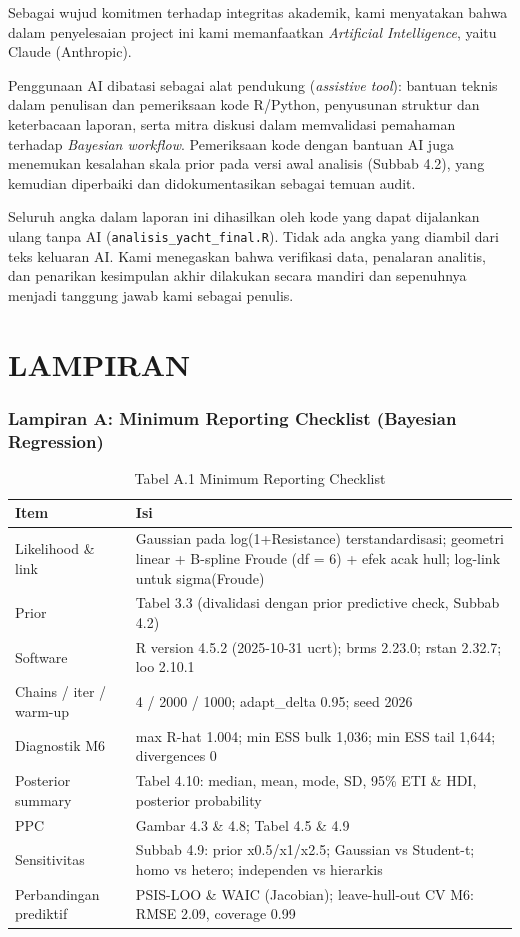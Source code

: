 \documentclass[
]{article}
\begin{document}
Sebagai wujud komitmen terhadap integritas akademik, kami menyatakan
bahwa dalam penyelesaian project ini kami memanfaatkan \emph{Artificial
Intelligence}, yaitu Claude (Anthropic).

Penggunaan AI dibatasi sebagai alat pendukung (\emph{assistive tool}):
bantuan teknis dalam penulisan dan pemeriksaan kode R/Python, penyusunan
struktur dan keterbacaan laporan, serta mitra diskusi dalam memvalidasi
pemahaman terhadap \emph{Bayesian workflow}. Pemeriksaan kode dengan
bantuan AI juga menemukan kesalahan skala prior pada versi awal analisis
(Subbab 4.2), yang kemudian diperbaiki dan didokumentasikan sebagai
temuan audit.

Seluruh angka dalam laporan ini dihasilkan oleh kode yang dapat
dijalankan ulang tanpa AI (\texttt{analisis\_yacht\_final.R}). Tidak ada
angka yang diambil dari teks keluaran AI. Kami menegaskan bahwa
verifikasi data, penalaran analitis, dan penarikan kesimpulan akhir
dilakukan secara mandiri dan sepenuhnya menjadi tanggung jawab kami
sebagai penulis.

\section{LAMPIRAN}\label{lampiran}

\subsubsection{Lampiran A: Minimum Reporting Checklist (Bayesian
Regression)}\label{lampiran-a-minimum-reporting-checklist-bayesian-regression}

\begingroup\fontsize{8.5}{10.5}\selectfont

\begin{longtable}[t]{ll}
\caption{\label{tab:lamp_report}Tabel A.1 Minimum Reporting Checklist}\\
\toprule
Item & Isi\\
\midrule
Likelihood \& link & Gaussian pada log(1+Resistance) terstandardisasi; geometri linear + B-spline Froude (df = 6) + efek acak hull; log-link untuk sigma(Froude)\\
Prior & Tabel 3.3 (divalidasi dengan prior predictive check, Subbab 4.2)\\
Software & R version 4.5.2 (2025-10-31 ucrt); brms 2.23.0; rstan 2.32.7; loo 2.10.1\\
Chains / iter / warm-up & 4 / 2000 / 1000; adapt\_delta 0.95; seed 2026\\
Diagnostik M6 & max R-hat 1.004; min ESS bulk 1,036; min ESS tail 1,644; divergences 0\\
\addlinespace
Posterior summary & Tabel 4.10: median, mean, mode, SD, 95\% ETI \& HDI, posterior probability\\
PPC & Gambar 4.3 \& 4.8; Tabel 4.5 \& 4.9\\
Sensitivitas & Subbab 4.9: prior x0.5/x1/x2.5; Gaussian vs Student-t; homo vs hetero; independen vs hierarkis\\
Perbandingan prediktif & PSIS-LOO \& WAIC (Jacobian); leave-hull-out CV M6: RMSE 2.09, coverage 0.99\\
\bottomrule
\end{longtable}
\endgroup{}
\end{document}
